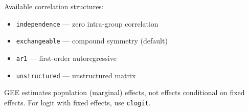 Available correlation structures:
\begin{itemize}
  \item \texttt{independence} — zero intra-group correlation
  \item \texttt{exchangeable} — compound symmetry (default)
  \item \texttt{ar1} — first-order autoregressive
  \item \texttt{unstructured} — unstructured matrix
\end{itemize}

\begin{nota}
  GEE estimates population (marginal) effects, not effects conditional
  on fixed effects. For logit with fixed effects, use \texttt{clogit}.
\end{nota}
